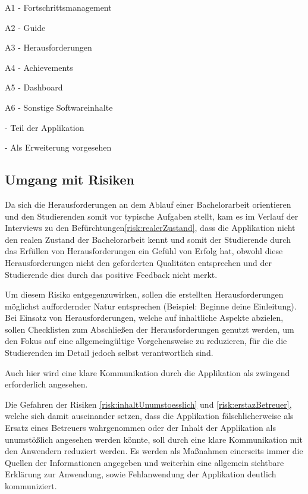\documentclass{scrreprt}
\begin{document}
\begin{tablenotes}
\item  A1 - Fortschrittsmanagement
\item  A2 - Guide
\item  A3 - Herausforderungen
\item  A4 - Achievements
\item  A5 - Dashboard
\item  A6 - Sonstige Softwareinhalte
\item {} - Teil der Applikation
\item {} - Als Erweiterung vorgesehen
\end{tablenotes} 
\label{tab:abdeckungProduktfunktionen}

\newpage
\subsection{Umgang mit Risiken}

\par \medskip Da sich die Herausforderungen an dem Ablauf einer Bachelorarbeit orientieren und den Studierenden somit vor typische Aufgaben stellt, kam es im Verlauf der Interviews zu den Befürchtungen\ref{risk:realerZustand}, dass die Applikation nicht den realen Zustand der Bachelorarbeit kennt und somit der Studierende durch das Erfüllen von Herausforderungen ein Gefühl von Erfolg hat, obwohl diese Herausforderungen nicht den geforderten Qualitäten entsprechen und der Studierende dies durch das positive Feedback nicht merkt.
\par Um diesem Risiko entgegenzuwirken, sollen die erstellten Herausforderungen möglichst auffordernder Natur entsprechen (Beispiel: Beginne deine Einleitung). Bei Einsatz von Herausforderungen, welche auf inhaltliche Aspekte abzielen, sollen Checklisten zum Abschließen der Herausforderungen genutzt werden, um den Fokus auf eine allgemeingültige Vorgehensweise zu reduzieren, für die die Studierenden im Detail jedoch selbst verantwortlich sind. 
\par Auch hier wird eine klare Kommunikation durch die Applikation als zwingend erforderlich angesehen.

\par \medskip Die Gefahren der Risiken \ref{risk:inhaltUnumstoesslich} und \ref{risk:erstazBetreuer}, welche sich damit auseinander setzen, dass die Applikation fälschlicherweise als Ersatz eines Betreuers wahrgenommen oder der Inhalt der Applikation als unumstößlich angesehen werden könnte, soll durch eine klare Kommunikation mit den Anwendern reduziert werden. Es werden als Maßnahmen einerseits immer die Quellen der Informationen angegeben und weiterhin eine allgemein sichtbare Erklärung zur Anwendung, sowie Fehlanwendung der Applikation deutlich kommuniziert.
\end{document}
